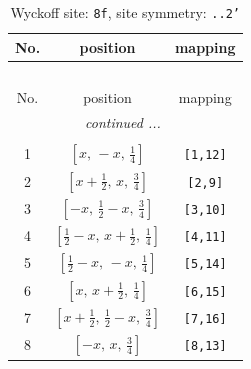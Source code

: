 \documentclass[fleqn,8pt]{jsarticle}
\begin{document}
\begin{longtable}{ccc}
\caption{Wyckoff site: {\tt 8f}, site symmetry: {\tt ..2'}}
 \\
 \hline \hline
No. & position & mapping \\ \hline \endfirsthead

\multicolumn{2}{l}{\tablename\ \thetable{}} \\
 \hline \hline
No. & position & mapping \\ \hline \endhead

 \hline \hline
\multicolumn{2}{r}{\footnotesize\it continued ...} \\ \endfoot

 \hline \hline
\multicolumn{2}{r}{} \\ \endlastfoot

1 & $\left[ x,\, - x,\, \frac{1}{4} \right]$ & {\tt [1,12]} \\ \hline
2 & $\left[ x + \frac{1}{2},\, x,\, \frac{3}{4} \right]$ & {\tt [2,9]} \\ \hline
3 & $\left[ - x,\, \frac{1}{2} - x,\, \frac{3}{4} \right]$ & {\tt [3,10]} \\ \hline
4 & $\left[ \frac{1}{2} - x,\, x + \frac{1}{2},\, \frac{1}{4} \right]$ & {\tt [4,11]} \\ \hline
5 & $\left[ \frac{1}{2} - x,\, - x,\, \frac{1}{4} \right]$ & {\tt [5,14]} \\ \hline
6 & $\left[ x,\, x + \frac{1}{2},\, \frac{1}{4} \right]$ & {\tt [6,15]} \\ \hline
7 & $\left[ x + \frac{1}{2},\, \frac{1}{2} - x,\, \frac{3}{4} \right]$ & {\tt [7,16]} \\ \hline
8 & $\left[ - x,\, x,\, \frac{3}{4} \right]$ & {\tt [8,13]} \\
\end{longtable}
\renewcommand{\arraystretch}{1.2}
\end{document}
